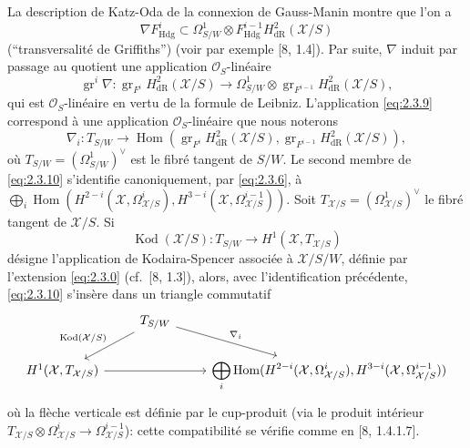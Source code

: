 \documentclass[12pt,a4paper]{article}
\theoremstyle{plain}
\theoremstyle{definition}
\theoremstyle{remark}
\DeclareMathOperator{\Hom}{Hom}
\DeclareMathOperator{\gr}{gr}
\DeclareMathOperator{\Kod}{Kod}
\newcommand{\Hdg}{\mathrm{Hdg}}
\begin{document}
La description de Katz-Oda de la connexion de Gauss-Manin montre que l'on a
\begin{equation}\label{eq:2.3.8}
\nabla F^i_{\Hdg} \subset \Omega^1_{S/W} \otimes F^{i-1}_{\Hdg} H^2_{\mathrm{dR}}(\mathcal{X}/S)
\end{equation}
(``transversalité de Griffiths'') (voir par exemple [8, 1.4]). Par suite, $\nabla$ induit par passage au quotient une application $\mathcal{O}_S$-linéaire
\begin{equation}\label{eq:2.3.9}
\gr^i \nabla: \gr_{F^i} H^2_{\mathrm{dR}}(\mathcal{X}/S) \to \Omega^1_{S/W} \otimes \gr_{F^{i-1}} H^2_{\mathrm{dR}}(\mathcal{X}/S),
\end{equation}
qui est $\mathcal{O}_S$-linéaire en vertu de la formule de Leibniz. L'application \eqref{eq:2.3.9} correspond à une application $\mathcal{O}_S$-linéaire que nous noterons
\begin{equation}\label{eq:2.3.10}
\nabla_i: T_{S/W} \to \Hom(\gr_{F^i} H^2_{\mathrm{dR}}(\mathcal{X}/S), \gr_{F^{i-1}} H^2_{\mathrm{dR}}(\mathcal{X}/S)),
\end{equation}
où $T_{S/W} = (\Omega^1_{S/W})^{\vee}$ est le fibré tangent de $S/W$. Le second membre de \eqref{eq:2.3.10} s'identifie canoniquement, par \eqref{eq:2.3.6}, à $\bigoplus_i \Hom(H^{2-i}(\mathcal{X}, \Omega^i_{\mathcal{X}/S}), H^{3-i}(\mathcal{X}, \Omega^{i-1}_{\mathcal{X}/S}))$. Soit $T_{\mathcal{X}/S} = (\Omega^1_{\mathcal{X}/S})^{\vee}$ le fibré tangent de $\mathcal{X}/S$. Si
\begin{equation}\label{eq:2.3.11}
\Kod(\mathcal{X}/S): T_{S/W} \to H^1(\mathcal{X}, T_{\mathcal{X}/S})
\end{equation}
désigne l'application de Kodaira-Spencer associée à $\mathcal{X}/S/W$, définie par l'extension \eqref{eq:2.3.0} (cf.~[8, 1.3]), alors, avec l'identification précédente, \eqref{eq:2.3.10} s'insère dans un triangle commutatif
\begin{equation}\label{eq:2.3.12}
\begin{tikzcd}
& T_{S/W} \arrow[dl, "{\Kod(\mathcal{X}/S)}"'] \arrow[dr, "{\nabla_i}"] & \\
H^1(\mathcal{X}, T_{\mathcal{X}/S}) \arrow[rr] & & \displaystyle\bigoplus_i \Hom(H^{2-i}(\mathcal{X}, \Omega^i_{\mathcal{X}/S}), H^{3-i}(\mathcal{X}, \Omega^{i-1}_{\mathcal{X}/S}))
\end{tikzcd}
\end{equation}
où la flèche verticale est définie par le cup-produit (via le produit intérieur $T_{\mathcal{X}/S} \otimes \Omega^i_{\mathcal{X}/S} \to \Omega^{i-1}_{\mathcal{X}/S}$): cette compatibilité se vérifie comme en [8, 1.4.1.7].
\end{document}
